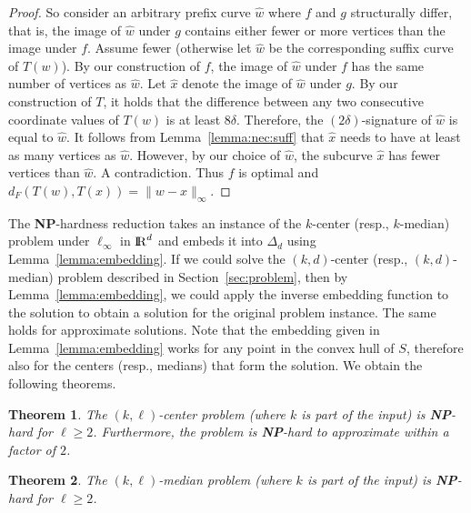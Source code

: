 \documentclass[11pt, letter]{article}
\newtheorem{theorem}{Theorem}[section]
\newcommand{\secref}[1]{Section~\ref{sec:#1}}
\newcommand{\thmlab}[1]{{\label{theo:#1}}}
\newcommand{\lemref}[1]{Lemma~\ref{lemma:#1}}
\newcommand{\NP}{\textbf{NP}} \newcommand{\spine}{\textsl{spine}}
\providecommand{\pth}[2][\!]{#1\left({#2}\right)}
\renewcommand{\Re}{{\rm I\!\hspace{-0.025em} R}}
\newcommand{\nrClusters}{\ensuremath{k}}
\newcommand{\lenClusters}{\ensuremath{\ell}}
\newcommand{\distFr}[2]{\ensuremath{d_F\pth{#1,#2}}}
\begin{document}
\begin{proof}
So consider an arbitrary prefix curve $\widehat{w}$ where $f$ and $g$
structurally differ, that is, the image of $\widehat{w}$ under $g$ contains
either fewer or more vertices than the image under $f$.
Assume fewer (otherwise let $\widehat{w}$ be the corresponding suffix curve of
$T(w)$).  By our construction of $f$, the image of $\widehat{w}$ under
$f$ has the same number of vertices as $\widehat{w}$.  Let $\widehat{x}$ denote
the image of $\widehat{w}$ under $g$.   
By our construction of $T$, it holds that the difference between 
any two consecutive coordinate values of $T(w)$ is at least $8\delta$.  
Therefore, the $(2\delta)$-signature of $\widehat{w}$ is equal to $\widehat{w}$.
It follows from \lemref{nec:suff} that $\widehat{x}$ needs to have at least as
many vertices as $\widehat{w}$. However, by our choice of $\widehat{w}$, the subcurve
$\widehat{x}$ has fewer vertices than $\widehat{w}$. A contradiction.
Thus $f$ is optimal and $\distFr{T(w)}{ T(x)} = \| w-x\|_{\infty}$.
\end{proof}

 The \textbf{NP}-hardness reduction takes an instance of the $k$-center (resp.,
$k$-median) problem under $\ell_{\infty}$ in $\Re^d$ and embeds it into $\Delta_d$
using \lemref{embedding}.  If we could solve the $(k,d)$-center (resp.,
$(k,d)$-median) problem described in \secref{problem}, then by
\lemref{embedding}, we could apply the inverse embedding function to the
solution to obtain a solution for the original problem instance. The same holds
for approximate solutions. Note that the embedding given in \lemref{embedding}
works for any point in the convex hull of $S$, therefore also for the centers
(resp., medians) that form the solution. We obtain the following theorems.

\begin{theorem}\thmlab{center:nphard}
The $(\nrClusters,\lenClusters)$-center problem (where $\nrClusters$ is part of the input) is \NP-hard for
$\lenClusters \geq 2$.  Furthermore, the problem is \NP-hard to approximate within a
factor of $2$.
\end{theorem}

\begin{theorem}\thmlab{median:nphard}
The $(\nrClusters,\lenClusters)$-median problem (where $\nrClusters$ is part of the input) 
is \NP-hard for $\lenClusters \geq 2$. 
\end{theorem}
\end{document}
